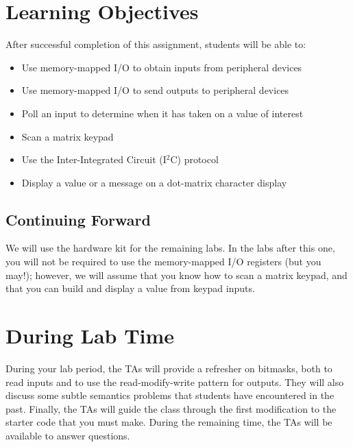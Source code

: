 \section*{Learning Objectives}

After successful completion of this assignment, students will be able to:
\begin{itemize}
\item Use memory-mapped I/O to obtain inputs from peripheral devices
\item Use memory-mapped I/O to send outputs to peripheral devices
\item Poll an input to determine when it has taken on a value of interest
\item Scan a matrix keypad
\item Use the Inter-Integrated Circuit (I$^2$C) protocol
\item Display a value or a message on a dot-matrix character display
\end{itemize}

\subsection*{Continuing Forward}

We will use the hardware kit for the remaining labs. In the labs after this one,
you will not be required to use the memory-mapped I/O registers (but you may!);
however, we will assume that you know how to scan a matrix keypad, and that you
can build and display a value from keypad inputs.

\section*{During Lab Time}

During your lab period, the TAs will provide a refresher on bitmasks, both to
read inputs and to use the read-modify-write pattern for outputs. They will also
discuss some subtle semantics problems that students have encountered in the
past. Finally, the TAs will guide the class through the first modification to
the starter code that you must make. During the remaining time, the TAs will be
available to answer questions.

\softwareengineeringfrontmatter

